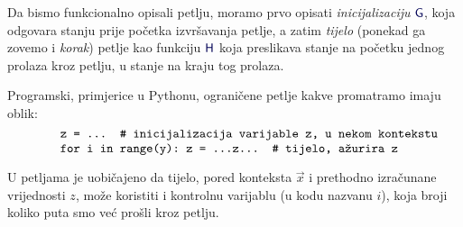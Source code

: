 
Da bismo funkcionalno opisali petlju, moramo prvo opisati \emph{inicijalizaciju} $\f G$, koja odgovara stanju prije početka izvršavanja petlje, a zatim \emph{tijelo} (ponekad ga zovemo i \emph{korak}) petlje kao funkciju $\f H$ koja preslikava stanje na početku jednog prolaza kroz petlju, u stanje na kraju tog prolaza. %

Programski, primjerice u Pythonu, ograničene petlje kakve promatramo imaju oblik:
\begin{equation}
	\begin{minipage}{0.8\textwidth}
\begin{verbatim}
z = ...  # inicijalizacija varijable z, u nekom kontekstu
for i in range(y): z = ...z...  # tijelo, ažurira z
\end{verbatim}
	\end{minipage}
\end{equation}

U petljama je uobičajeno da tijelo, pored konteksta $\vec x$ i prethodno izračunane vrijednosti $z$, može koristiti i kontrolnu varijablu (u kodu nazvanu $i$), koja broji koliko puta smo već prošli kroz petlju.


